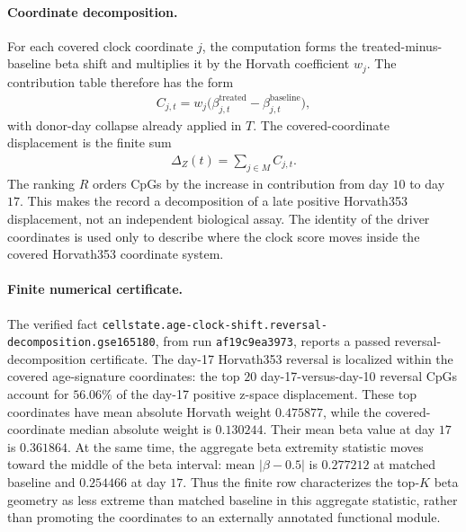\paragraph{Coordinate decomposition.}
For each covered clock coordinate $j$, the computation forms the treated-minus-baseline beta shift and multiplies it by the Horvath coefficient $w_j$. The contribution table therefore has the form
$$
\begin{aligned}
C_{j,t}=w_j\bigl(\beta_{j,t}^{\mathrm{treated}}-\beta_{j,t}^{\mathrm{baseline}}\bigr),
\end{aligned}
$$
with donor-day collapse already applied in $T$. The covered-coordinate displacement is the finite sum
$$
\begin{aligned}
\Delta_Z(t)=\sum_{j\in M} C_{j,t}.
\end{aligned}
$$
The ranking $R$ orders CpGs by the increase in contribution from day $10$ to day $17$. This makes the record a decomposition of a late positive Horvath353 displacement, not an independent biological assay. The identity of the driver coordinates is used only to describe where the clock score moves inside the covered Horvath353 coordinate system.

\paragraph{Finite numerical certificate.}
The verified fact \texttt{cellstate.age-clock-shift.reversal-decomposition.gse165180}, from run \texttt{af19c9ea3973}, reports a passed reversal-decomposition certificate. The day-17 Horvath353 reversal is localized within the covered age-signature coordinates: the top $20$ day-17-versus-day-10 reversal CpGs account for $56.06\%$ of the day-17 positive z-space displacement. These top coordinates have mean absolute Horvath weight $0.475877$, while the covered-coordinate median absolute weight is $0.130244$. Their mean beta value at day $17$ is $0.361864$. At the same time, the aggregate beta extremity statistic moves toward the middle of the beta interval: mean $|\beta-0.5|$ is $0.277212$ at matched baseline and $0.254466$ at day $17$. Thus the finite row characterizes the top-$K$ beta geometry as less extreme than matched baseline in this aggregate statistic, rather than promoting the coordinates to an externally annotated functional module.


